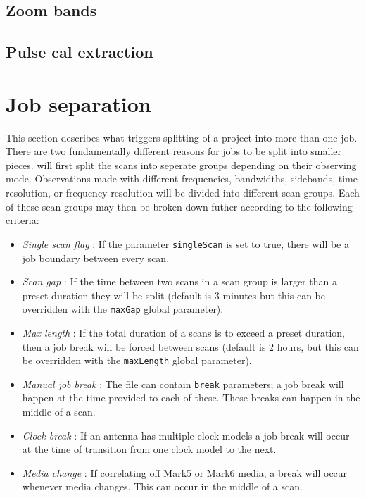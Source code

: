 \documentclass[12pt]{article}
\begin{document}
\subsection{Zoom bands}



\subsection{Pulse cal extraction}



\section{Job separation} \label{sec:break}

This section describes what triggers splitting of a project into more than one job.
There are two fundamentally different reasons for jobs to be split into smaller pieces.
\vexdifx will first split the scans into seperate groups depending on their observing mode.
Observations made with different frequencies, bandwidths, sidebands, time resolution, or frequency resolution will be divided into different scan groups.
Each of these scan groups may then be broken down futher according to the following criteria:
\begin{itemize}
\item {\em Single scan flag} : If the parameter {\tt singleScan} is set to true, there will be a job boundary between every scan.
\item {\em Scan gap} : If the time between two scans in a scan group is larger than a preset duration they will be split (default is 3 minutes but this can be overridden with the {\tt maxGap} global parameter).
\item {\em Max length} : If the total duration of a scans is to exceed a preset duration, then a job break will be forced between scans (default is 2 hours, but this can be overridden with the {\tt maxLength} global parameter).
\item {\em Manual job break} : The \vd file can contain {\tt break} parameters; a job break will happen at the time provided to each of these.  These breaks can happen in the middle of a scan.
\item {\em Clock break} : If an antenna has multiple clock models a job break will occur at the time of transition from one clock model to the next.
\item {\em Media change} : If correlating off Mark5 or Mark6 media, a break will occur whenever media changes.  This can occur in the middle of a scan.
\end{itemize}
\end{document}
